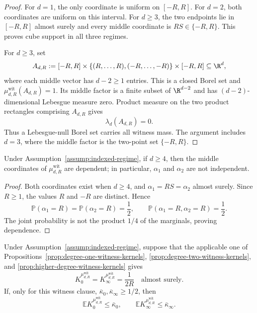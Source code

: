 \begin{proof}
For $d=1$, the only coordinate is uniform on $[-R,R]$.  For $d=2$, both
coordinates are uniform on this interval.  For $d\geq3$, the two endpoints
lie in $[-R,R]$ almost surely and every middle coordinate is
$RS\in\{-R,R\}$.  This proves cube support in all three regimes.

For $d\geq3$, set
\[
A_{d,R}:=[-R,R]\times
\{(R,\ldots,R),(-R,\ldots,-R)\}\times[-R,R]\subseteq\R^d,
\]
where each middle vector has $d-2\geq1$ entries.  This is a closed Borel set
and $\mu^{\mathrm{wit}}_{d,R}(A_{d,R})=1$.  Its middle factor is a finite
subset of $\R^{d-2}$ and has $(d-2)$-dimensional Lebesgue measure zero.
Product measure on the two product rectangles comprising $A_{d,R}$
\cite[Theorem~2.37]{Folland1999} gives
\[
\lambda_d(A_{d,R})=0.
\]
Thus a Lebesgue-null Borel set carries all witness mass.  The argument
includes $d=3$, where the middle factor is the two-point set $\{-R,R\}$.
\end{proof}

\begin{proposition}
\label{prop:witness-middle-dependence}
Under Assumption~\ref{assump:indexed-regime}, if $d\geq4$, then the middle
coordinates of $\mu^{\mathrm{wit}}_{d,R}$ are dependent; in particular,
$\alpha_1$ and $\alpha_2$ are not independent.
\end{proposition}

\begin{proof}
Both coordinates exist when $d\geq4$, and
$\alpha_1=RS=\alpha_2$ almost surely.  Since $R\geq1$, the values $R$ and
$-R$ are distinct.  Hence
\[
\mathbb P(\alpha_1=R)=\mathbb P(\alpha_2=R)=\frac12,
\qquad
\mathbb P(\alpha_1=R,\alpha_2=R)=\frac12.
\]
The joint probability is not the product $1/4$ of the marginals, proving
dependence.
\end{proof}

\begin{lemma}
\label{lem:witness-threshold}
Under Assumption~\ref{assump:indexed-regime}, suppose that the applicable
one of Propositions~\ref{prop:degree-one-witness-kernels},
\ref{prop:degree-two-witness-kernels}, and
\ref{prop:higher-degree-witness-kernels} gives
\[
K_0^{\mu^{\mathrm{wit}}_{d,R}}
=K_\infty^{\mu^{\mathrm{wit}}_{d,R}}
=\frac1{2R}\quad\text{almost surely}.
\]
If, only for this witness clause,
$\bar\kappa_0,\bar\kappa_\infty\geq1/2$, then
\[
\mathbb E K_0^{\mu^{\mathrm{wit}}_{d,R}}\leq\bar\kappa_0,
\qquad
\mathbb E K_\infty^{\mu^{\mathrm{wit}}_{d,R}}\leq\bar\kappa_\infty.
\]
\end{lemma}


